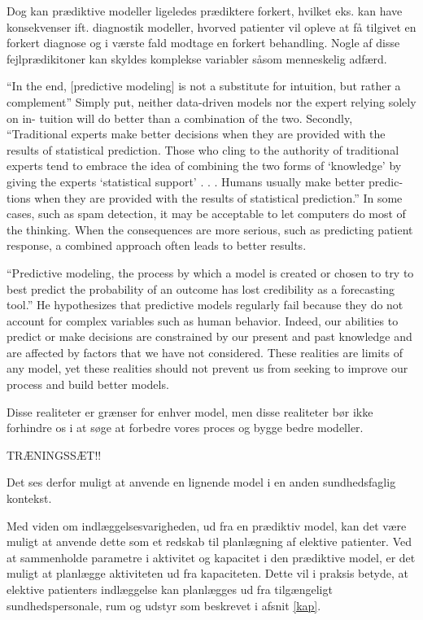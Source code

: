 Dog kan prædiktive modeller ligeledes prædiktere forkert, hvilket eks. kan have konsekvenser ift. diagnostik modeller, hvorved patienter vil opleve at få tilgivet en forkert diagnose og i værste fald modtage en forkert behandling. Nogle af disse fejlprædikitoner kan skyldes komplekse variabler såsom menneskelig adfærd.


“In the end, [predictive modeling] is not a substitute for intuition, but rather a
complement”
Simply put, neither data-driven models nor the expert relying solely on in-
tuition will do better than a combination of the two. Secondly,
“Traditional experts make better decisions when they are provided with the
results of statistical prediction. Those who cling to the authority of traditional experts tend to embrace the idea of combining the two forms of ‘knowledge’ by
giving the experts ‘statistical support’ . . . Humans usually make better predic-
tions when they are provided with the results of statistical prediction.”
In some cases, such as spam detection, it may be acceptable to let computers
do most of the thinking. When the consequences are more serious, such as
predicting patient response, a combined approach often leads to better results.




“Predictive modeling, the process by which a
model is created or chosen to try to best predict the probability of an outcome
has lost credibility as a forecasting tool.” He hypothesizes that predictive
models regularly fail because they do not account for complex variables such
as human behavior. Indeed, our abilities to predict or make decisions are
constrained by our present and past knowledge and are affected by factors
that we have not considered. These realities are limits of any model, yet these
realities should not prevent us from seeking to improve our process and build
better models.


Disse realiteter er grænser for enhver model, men disse
realiteter bør ikke forhindre os i at søge at forbedre vores proces og bygge
bedre modeller.









TRÆNINGSSÆT!!

Det ses derfor muligt at anvende en lignende model i en anden sundhedsfaglig kontekst.


Med viden om indlæggelsesvarigheden, ud fra en prædiktiv model, kan det være muligt at anvende dette som et redskab til planlægning af elektive patienter. Ved at sammenholde parametre i aktivitet og kapacitet i den prædiktive model, er det muligt at planlægge aktiviteten ud fra kapaciteten. Dette vil i praksis betyde, at elektive patienters indlæggelse kan planlægges ud fra tilgængeligt sundhedspersonale, rum og udstyr som beskrevet i afsnit \ref{kap}. 


